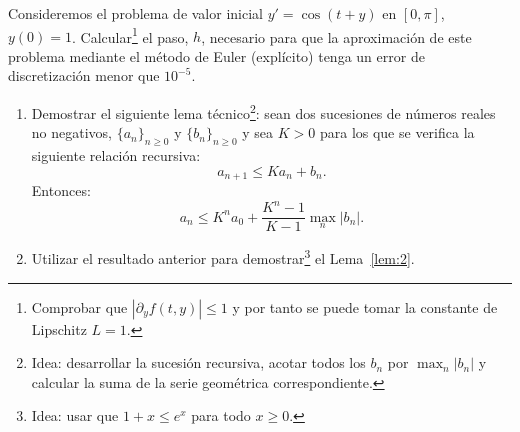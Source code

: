   \begin{EjerciciosPropuestos}

    \begin{problema}
      Consideremos el problema de valor inicial $y'=\cos(t+y)$ en
      $[0,\pi]$, $y(0)=1$. Calcular\footnote{Comprobar que
        $|\partial_y f(t,y)|\le 1$ y por tanto se puede tomar la
        constante de Lipschitz $L=1$.} el paso, $h$, necesario para que
        la aproximación de este problema mediante el método de Euler
        (explícito) tenga un error de discretización menor que
        $10^{-5}$.
    \end{problema}

    \begin{problema}
      \begin{enumerate}
      \item Demostrar el siguiente lema técnico\footnote{Idea: desarrollar la
        sucesión recursiva, acotar todos los $b_n$ por $\max_n|b_n|$ y calcular
        la suma de la serie geométrica correspondiente.}: sean dos sucesiones de
        números reales no negativos, $\{a_n\}_{n\ge 0}$ y
        $\{b_n\}_{n\ge 0}$ y sea $K>0$ para los que se verifica la
        siguiente relación recursiva:
        $$
        a_{n+1} \le K a_n + b_n.
        $$
        Entonces:
        \begin{equation*}
         a_n \le K^n a_0 + \frac{K^n-1}{K-1}\max_n|b_n|.
        \end{equation*}

      \item Utilizar el resultado anterior para demostrar\footnote{Idea: usar que $1+x\le e^x$ para todo $x\ge 0$.} el Lema~\ref{lem:2}.
      \end{enumerate}
    \end{problema}


\end{EjerciciosPropuestos}
